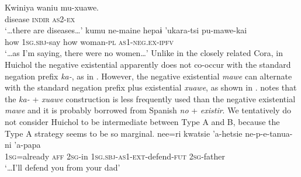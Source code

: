 \documentclass[output=paper,draft,draftmode,colorlinks,citecolor=brown]{langscibook}
\begin{document}
\ea
\label{ex:odam-huichdisea}
\gll Kwiniya	waniu 		mu-xuawe.\\
disease	\textsc{indir} 	\textsc{as2-ex}\\
\glt ‘…there are diseases…’ \citep[112]{bierge2017}
\z 
\ea
\label{ex:odam-huichyb}
\gll kumu ne-maine hepaɨ ’ukara-tsi pu-mawe-kai\\
how \textsc{1sg.sbj}-say how woman-\textsc{pl} \textsc{as1-neg.ex-ipfv}\\
\glt ‘…as I’m saying, there were no women…’ \citep[114]{bierge2017}
\z 
Unlike in the closely related Cora, in Huichol the negative existential apparently does not co-occur with the standard negation prefix \emph{ka-}, as in . However, the negative existential \emph{mawe} can alternate with the standard negation prefix plus existential \emph{xuawe}, as shown in . \citet[115]{bierge2017} notes that the \emph{ka-} + \emph{xuawe} construction is less frequently used than the negative existential \emph{mawe} and it is probably borrowed from Spanish \emph{no} + \emph{existir}. We tentatively do not consider Huichol to be intermediate between Type A and B, because the Type A strategy seems to be so marginal.
\ea
\label{ex:odam-huichnew}
\gll nee=ri kwatsie ’a-hetsie ne-p-e-tanua-ni ’a-papa\\
 \textsc{1sg}=already \textsc{aff} \textsc{2sg}-in \textsc{1sg.sbj-as1-ext}-defend-\textsc{fut} \textsc{2sg}-father\\
\glt ‘…I’ll defend you from your dad’
\end{document}
